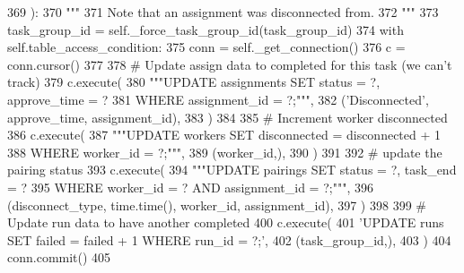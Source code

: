 \begin{DoxyCode}
369     ):
370         \textcolor{stringliteral}{"""}
371 \textcolor{stringliteral}{        Note that an assignment was disconnected from.}
372 \textcolor{stringliteral}{        """}
373         task\_group\_id = self.\_force\_task\_group\_id(task\_group\_id)
374         with self.table\_access\_condition:
375             conn = self.\_get\_connection()
376             c = conn.cursor()
377 
378             \textcolor{comment}{# Update assign data to completed for this task (we can't track)}
379             c.execute(
380                 \textcolor{stringliteral}{"""UPDATE assignments SET status = ?, approve\_time = ?}
381 \textcolor{stringliteral}{                         WHERE assignment\_id = ?;"""},
382                 (\textcolor{stringliteral}{'Disconnected'}, approve\_time, assignment\_id),
383             )
384 
385             \textcolor{comment}{# Increment worker disconnected}
386             c.execute(
387                 \textcolor{stringliteral}{"""UPDATE workers SET disconnected = disconnected + 1}
388 \textcolor{stringliteral}{                         WHERE worker\_id = ?;"""},
389                 (worker\_id,),
390             )
391 
392             \textcolor{comment}{# update the pairing status}
393             c.execute(
394                 \textcolor{stringliteral}{"""UPDATE pairings SET status = ?, task\_end = ?}
395 \textcolor{stringliteral}{                         WHERE worker\_id = ? AND assignment\_id = ?;"""},
396                 (disconnect\_type, time.time(), worker\_id, assignment\_id),
397             )
398 
399             \textcolor{comment}{# Update run data to have another completed}
400             c.execute(
401                 \textcolor{stringliteral}{'UPDATE runs SET failed = failed + 1 WHERE run\_id = ?;'},
402                 (task\_group\_id,),
403             )
404             conn.commit()
405 
\end{DoxyCode}
\mbox{\label{classparlai_1_1mturk_1_1core_1_1dev_1_1mturk__data__handler_1_1MTurkDataHandler_ab175fd5970bfd7b24751ad99e7b99111}} 

